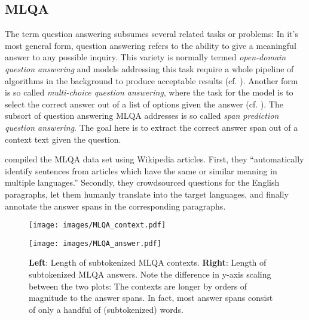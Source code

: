 \subsection{MLQA}
\label{sec:mlqa}

The term question answering subsumes several related tasks or problems: In it's most
general form, question answering refers to the ability to give a meaningful answer
to any possible inquiry. This variety is normally termed \emph{open-domain question
answering} and models addressing this task require a whole pipeline of algorithms in
the background to produce acceptable results (cf. \cite{chen-yih-2020-open}). Another
form is so called \emph{multi-choice question answering}, where the task for the
model is to select the correct answer out of a list of options given the answer (cf.
\cite{welbl2017crowdsourcing}). The subsort of question answering MLQA addresses is
so called \emph{span prediction question answering}. The goal here is to extract the
correct answer span out of a context text given the question.

\cite{lewis2019mlqa} compiled the MLQA data set using Wikipedia articles. First, they
``automatically identify sentences from \textelp{} articles which have the same or
similar meaning in multiple languages.'' Secondly, they crowdsourced questions
for the English paragraphs, let them humanly translate into the target languages,
and finally annotate the answer spans in the corresponding paragraphs.

\begin{figure}
  \begin{minipage}{0.45\linewidth}
  \vspace{0pt}
    \texttt{[image: images/MLQA\_context.pdf]}
  \end{minipage}
  \hfill
  \begin{minipage}{0.45\linewidth}
  \vspace{0pt}
    \texttt{[image: images/MLQA\_answer.pdf]}
  \end{minipage}
  \caption[MLQA Lengths]{\textbf{Left}: Length of subtokenized MLQA contexts.
                         \textbf{Right}: Length of subtokenized MLQA answers. Note the difference in y-axis scaling between the two plots:
                         The contexts are longer by orders of magnitude to the answer spans. In fact, most answer spans consist of only a handful of
                         (subtokenized) words.}
  \label{fig:mlqa-stats}
\end{figure}

